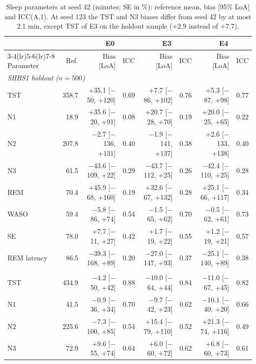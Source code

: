 \documentclass[10pt,a4paper]{article}
\begin{document}
\begin{table}[H]
\centering\scriptsize
\caption{Sleep parameters at seed 42 (minutes; SE in \%): reference mean, bias [95\% LoA] and ICC(A,1).
At seed 123 the TST and N3 biases differ from seed 42 by at most 2.1 min, except TST of E3 on the holdout
sample ($+2.9$ instead of $+7.7$).}
\label{tab:sup_sleep_params}
\setlength{\tabcolsep}{3pt}
\begin{tabular}{lrrrrrrr}
\toprule
& & \multicolumn{2}{c}{E0} & \multicolumn{2}{c}{E3} & \multicolumn{2}{c}{E4} \\
\cmidrule(lr){3-4}\cmidrule(lr){5-6}\cmidrule(lr){7-8}
Parameter & Ref. & Bias [LoA] & ICC & Bias [LoA] & ICC & Bias [LoA] & ICC \\
\midrule
\multicolumn{8}{l}{\textit{SHHS1 holdout ($n=500$)}} \\
TST & 358.7 & +35.1 [$-$50, +120] & 0.69 & +7.7 [$-$86, +102] & 0.76 & +5.3 [$-$87, +98] & 0.77 \\
N1 & 18.9 & +35.6 [$-$20, +91] & 0.08 & +20.7 [$-$28, +70] & 0.19 & +20.0 [$-$25, +65] & 0.22 \\
N2 & 207.8 & $-$2.7 [$-$136, +131] & 0.40 & $-$1.9 [$-$141, +137] & 0.38 & +2.6 [$-$133, +138] & 0.40 \\
N3 & 61.5 & $-$43.6 [$-$109, +22] & 0.29 & $-$43.7 [$-$112, +25] & 0.26 & $-$42.4 [$-$110, +25] & 0.28 \\
REM & 70.4 & +45.9 [$-$68, +160] & 0.19 & +32.6 [$-$67, +132] & 0.28 & +25.1 [$-$66, +117] & 0.34 \\
WASO & 59.4 & $-$5.8 [$-$86, +74] & 0.54 & $-$1.5 [$-$65, +62] & 0.70 & $-$0.5 [$-$62, +61] & 0.73 \\
SE & 78.0 & +7.7 [$-$11, +27] & 0.42 & +1.7 [$-$19, +22] & 0.55 & +1.2 [$-$19, +21] & 0.57 \\
REM latency & 86.5 & $-$39.3 [$-$168, +89] & 0.20 & $-$27.0 [$-$147, +93] & 0.37 & $-$25.1 [$-$140, +89] & 0.38 \\
\addlinespace
\multicolumn{8}{l}{\textit{Telemetry ($n=44$ nights)}} \\
TST & 434.9 & $-$4.2 [$-$50, +42] & 0.88 & $-$10.0 [$-$64, +44] & 0.84 & $-$11.0 [$-$67, +45] & 0.82 \\
N1 & 41.5 & $-$0.9 [$-$36, +34] & 0.70 & $-$9.7 [$-$42, +23] & 0.62 & $-$10.1 [$-$40, +20] & 0.66 \\
N2 & 225.6 & $-$7.3 [$-$100, +85] & 0.54 & +15.4 [$-$79, +110] & 0.52 & +21.3 [$-$74, +116] & 0.49 \\
N3 & 72.9 & +9.6 [$-$55, +74] & 0.64 & +6.0 [$-$60, +72] & 0.62 & +6.8 [$-$60, +73] & 0.61 \\

\end{tabular}
\end{table}
\end{document}
